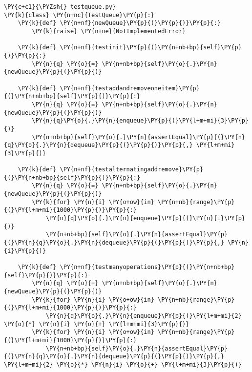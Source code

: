 \begin{Verbatim}[commandchars=\\\{\}]
\PY{c+c1}{\PYZsh{} testqueue.py}
\PY{k}{class} \PY{n+nc}{TestQueue}\PY{p}{:}
    \PY{k}{def} \PY{n+nf}{newQueue}\PY{p}{(}\PY{p}{)}\PY{p}{:}
        \PY{k}{raise} \PY{n+ne}{NotImplementedError}

    \PY{k}{def} \PY{n+nf}{testinit}\PY{p}{(}\PY{n+nb+bp}{self}\PY{p}{)}\PY{p}{:}
        \PY{n}{q} \PY{o}{=} \PY{n+nb+bp}{self}\PY{o}{.}\PY{n}{newQueue}\PY{p}{(}\PY{p}{)}

    \PY{k}{def} \PY{n+nf}{testaddandremoveoneitem}\PY{p}{(}\PY{n+nb+bp}{self}\PY{p}{)}\PY{p}{:}
        \PY{n}{q} \PY{o}{=} \PY{n+nb+bp}{self}\PY{o}{.}\PY{n}{newQueue}\PY{p}{(}\PY{p}{)}
        \PY{n}{q}\PY{o}{.}\PY{n}{enqueue}\PY{p}{(}\PY{l+m+mi}{3}\PY{p}{)}
        \PY{n+nb+bp}{self}\PY{o}{.}\PY{n}{assertEqual}\PY{p}{(}\PY{n}{q}\PY{o}{.}\PY{n}{dequeue}\PY{p}{(}\PY{p}{)}\PY{p}{,} \PY{l+m+mi}{3}\PY{p}{)}

    \PY{k}{def} \PY{n+nf}{testalternatingaddremove}\PY{p}{(}\PY{n+nb+bp}{self}\PY{p}{)}\PY{p}{:}
        \PY{n}{q} \PY{o}{=} \PY{n+nb+bp}{self}\PY{o}{.}\PY{n}{newQueue}\PY{p}{(}\PY{p}{)}
        \PY{k}{for} \PY{n}{i} \PY{o+ow}{in} \PY{n+nb}{range}\PY{p}{(}\PY{l+m+mi}{1000}\PY{p}{)}\PY{p}{:}
            \PY{n}{q}\PY{o}{.}\PY{n}{enqueue}\PY{p}{(}\PY{n}{i}\PY{p}{)}
            \PY{n+nb+bp}{self}\PY{o}{.}\PY{n}{assertEqual}\PY{p}{(}\PY{n}{q}\PY{o}{.}\PY{n}{dequeue}\PY{p}{(}\PY{p}{)}\PY{p}{,} \PY{n}{i}\PY{p}{)}

    \PY{k}{def} \PY{n+nf}{testmanyoperations}\PY{p}{(}\PY{n+nb+bp}{self}\PY{p}{)}\PY{p}{:}
        \PY{n}{q} \PY{o}{=} \PY{n+nb+bp}{self}\PY{o}{.}\PY{n}{newQueue}\PY{p}{(}\PY{p}{)}
        \PY{k}{for} \PY{n}{i} \PY{o+ow}{in} \PY{n+nb}{range}\PY{p}{(}\PY{l+m+mi}{1000}\PY{p}{)}\PY{p}{:}
            \PY{n}{q}\PY{o}{.}\PY{n}{enqueue}\PY{p}{(}\PY{l+m+mi}{2} \PY{o}{*} \PY{n}{i} \PY{o}{+} \PY{l+m+mi}{3}\PY{p}{)}
        \PY{k}{for} \PY{n}{i} \PY{o+ow}{in} \PY{n+nb}{range}\PY{p}{(}\PY{l+m+mi}{1000}\PY{p}{)}\PY{p}{:}
            \PY{n+nb+bp}{self}\PY{o}{.}\PY{n}{assertEqual}\PY{p}{(}\PY{n}{q}\PY{o}{.}\PY{n}{dequeue}\PY{p}{(}\PY{p}{)}\PY{p}{,} \PY{l+m+mi}{2} \PY{o}{*} \PY{n}{i} \PY{o}{+} \PY{l+m+mi}{3}\PY{p}{)}


\end{Verbatim}
